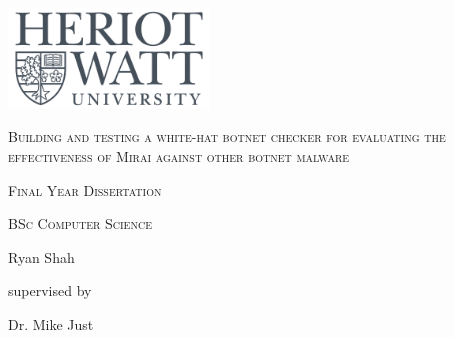\documentclass[11pt,a4paper]{report}
\begin{document}
	\begin{titlepage}
		\centering
		\vspace{4cm}
		\includegraphics[width=0.4\textwidth]{img/logo.png}\par
		\vspace{2cm}
		{\scshape\large Building and testing a white-hat botnet checker for evaluating the effectiveness of Mirai against other botnet malware\par}
		\vspace{2cm}
		{\scshape\large Final Year Dissertation\par}
		\vspace{0.5cm}
		{\scshape\large BSc Computer Science\par}
		\vspace{2cm}

		\vfill
			{\Large Ryan Shah\par}
			\vspace{1cm}
			supervised by\par
			Dr. Mike Just
		\vfill
	\end{titlepage}

	
	
	\tableofcontents

	
	
	
	
	
	
	

	
	

	\begin{appendices}
		
	\end{appendices}
\end{document}
